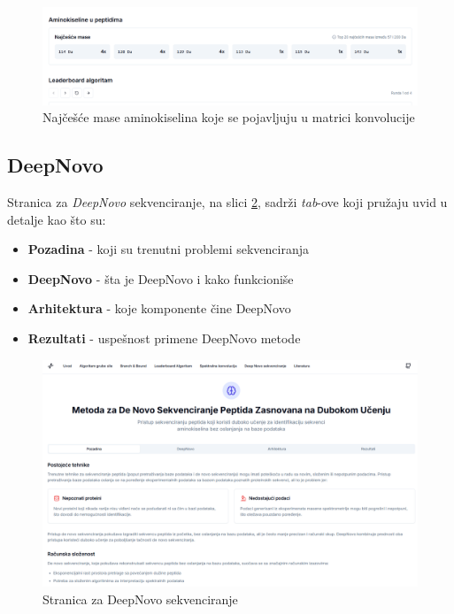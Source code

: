 \documentclass[12pt,oneside]{memoir}
\begin{document}
\begin{figure}[H]
\centering
\includegraphics[width=1\textwidth]{images/convolution_3.png}
\caption{Najčešće mase aminokiselina koje se pojavljuju u matrici konvolucije}
\label{fig:convolution_3}
\end{figure}

\subsection{DeepNovo}
Stranica za \emph{DeepNovo} sekvenciranje, na slici \ref{fig:deepnovo_1}, sadrži \emph{tab}-ove koji pružaju uvid u detalje kao što su:
\begin{itemize}
    \item \textbf{Pozadina} - koji su trenutni problemi sekvenciranja
    \item \textbf{DeepNovo} - šta je DeepNovo i kako funkcioniše
    \item \textbf{Arhitektura} - koje komponente čine DeepNovo
    \item \textbf{Rezultati} - uspešnost primene DeepNovo metode
\end{itemize}

\begin{figure}[h]
\centering
\includegraphics[width=1\textwidth]{images/deepnovo_1.png}
\caption{Stranica za DeepNovo sekvenciranje}
\label{fig:deepnovo_1}
\end{figure}
\end{document}
